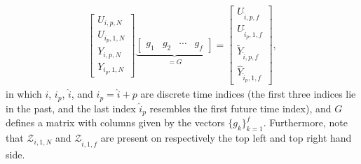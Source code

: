 \begin{align}\label{eq:CL_DeePC_no_IVs}
\begin{bmatrix}
    U_{i,p,N}\\U_{i_p,1,N}\\Y_{i,p,N}\\ \hline Y_{i_p,1,N}
\end{bmatrix}
\underbrace{
\begin{bmatrix}
    g_1 & g_2 & \cdots & g_f
\end{bmatrix}}_{= G} =
\begin{bmatrix}
    U_{\hat{i},p,f}\\
    U_{\hat{i}_p,1,f}\\
    \widetilde{Y}_{\hat{i},p,f}\\
    \hline
    \widehat{Y}_{\hat{i}_p,1,f}
\end{bmatrix},
\end{align}
in which $i$, $i_p$, $\hat{i}$, and $\hat{i}_p=\hat{i}+p$ are discrete time indices (the first three indices lie in the past, and the last index $\hat{i}_p$ resembles the first future time index), and $G$ defines a matrix with columns given by the vectors $\{g_k\}^f_{k=1}$. Furthermore, note that $\mathcal{Z}_{i,1,N}$ and $\mathcal{Z}_{\hat{i},1,f}$ are present on respectively the top left and top right hand side.

